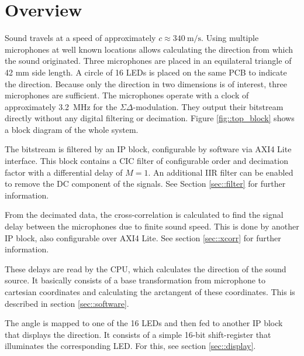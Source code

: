 \section{Overview}
Sound travels at a speed of approximately $c\approx \SI{340}{\meter\per\s}$.
Using multiple microphones at well known locations allows calculating the direction from which the sound originated.
Three microphones are placed in an equilateral triangle of 42 mm side length.
A circle of 16 LEDs is placed on the same PCB to indicate the direction.
Because only the direction in two dimensions is of interest, three microphones are sufficient.
The microphones operate with a clock of approximately \SI{3.2}{\mega\hertz} for the $\Sigma\Delta$-modulation.
They output their bitstream directly without any digital filtering or decimation.
Figure \ref{fig::top_block} shows a block diagram of the whole system.

The bitstream is filtered by an IP block, configurable by software via AXI4 Lite interface.
This block contains a CIC filter of configurable order and decimation factor with a differential delay of $M=1$.
An additional IIR filter can be enabled to remove the DC component of the signals.
See Section \ref{sec::filter} for further information.

From the decimated data, the cross-correlation is calculated to find the signal delay between the microphones due to finite sound speed.
This is done by another IP block, also configurable over AXI4 Lite.
See section \ref{sec::xcorr} for further information.

These delays are read by the CPU, which calculates the direction of the sound source. 
It basically consists of a base transformation from microphone to cartesian coordinates and calculating the arctangent of these coordinates.
This is described in section \ref{sec::software}.

The angle is mapped to one of the 16 LEDs and then fed to another IP block that displays the direction.
It consists of a simple 16-bit shift-register that illuminates the corresponding LED.
For this, see section \ref{sec::display}.

